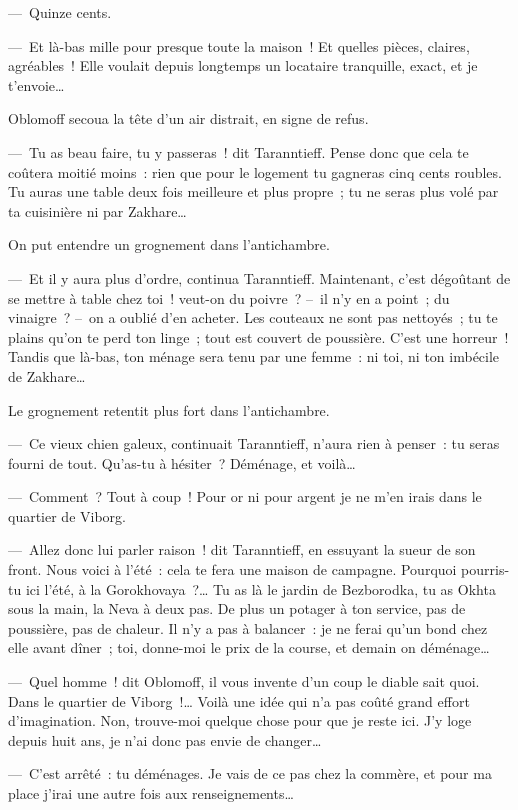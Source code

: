 \documentclass[french,twoside]{book} %
\begin{document}
— Quinze cents.\par
— Et là-bas mille pour presque toute la maison ! Et quelles pièces, claires, agréables ! Elle voulait depuis longtemps un locataire tranquille, exact, et je t’envoie…\par
Oblomoff secoua la tête d’un air distrait, en signe de refus.\par
— Tu as beau faire, tu y passeras ! dit Taranntieff. Pense donc que cela te coûtera moitié moins : rien que pour le logement tu gagneras cinq cents roubles. Tu auras une table deux fois meilleure et plus propre ; tu ne seras plus volé par ta cuisinière ni par Zakhare…\par
On put entendre un grognement dans l’antichambre.\par
— Et il y aura plus d’ordre, continua Taranntieff. Maintenant, c’est dégoûtant de se mettre à table chez toi ! veut-on du poivre ? – il n’y en a point ; du vinaigre ? – on a oublié d’en acheter. Les couteaux ne sont pas nettoyés ; tu te plains qu’on te perd ton linge ; tout est couvert de poussière. C’est une horreur ! Tandis que là-bas, ton ménage sera tenu par une femme : ni toi, ni ton imbécile de Zakhare…\par
Le grognement retentit plus fort dans l’antichambre.\par
— Ce vieux chien galeux, continuait Taranntieff, n’aura rien à penser : tu seras fourni de tout. Qu’as-tu à hésiter ? Déménage, et voilà…\par
— Comment ? Tout à coup ! Pour or ni pour argent je ne m’en irais dans le quartier de Viborg.\par
— Allez donc lui parler raison ! dit Taranntieff, en essuyant la sueur de son front. Nous voici à l’été : cela te fera une maison de campagne. Pourquoi pourris-tu ici l’été, à la Gorokhovaya ?… Tu as là le jardin de Bezborodka, tu as Okhta sous la main, la Neva à deux pas. De plus un potager à ton service, pas de poussière, pas de chaleur. Il n’y a pas à balancer : je ne ferai qu’un bond chez elle avant dîner ; toi, donne-moi le prix de la course, et demain on déménage…\par
— Quel homme ! dit Oblomoff, il vous invente d’un coup le diable sait quoi. Dans le quartier de Viborg !… Voilà une idée qui n’a pas coûté grand effort d’imagination. Non, trouve-moi quelque chose pour que je reste ici. J’y loge depuis huit ans, je n’ai donc pas envie de changer…\par
— C’est arrêté : tu déménages. Je vais de ce pas chez la commère, et pour ma place j’irai une autre fois aux renseignements…\par
\end{document}

